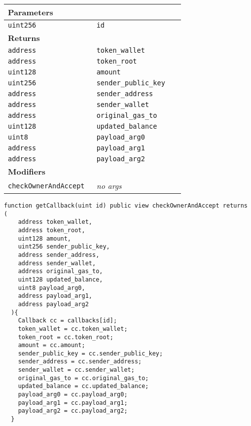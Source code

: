 \ifsoltables
\noindent\begin{tabular}{|l|l|p{5cm}|}\hline
\multicolumn{3}{|l|}{\bf Parameters}\\\hline
\tt uint256 & \tt id &\\\hline
\multicolumn{3}{|l|}{\bf Returns}\\\hline
\tt address & \tt token\_{}wallet &\\\hline
\tt address & \tt token\_{}root &\\\hline
\tt uint128 & \tt amount &\\\hline
\tt uint256 & \tt sender\_{}public\_{}key &\\\hline
\tt address & \tt sender\_{}address &\\\hline
\tt address & \tt sender\_{}wallet &\\\hline
\tt address & \tt original\_{}gas\_{}to &\\\hline
\tt uint128 & \tt updated\_{}balance &\\\hline
\tt uint8 & \tt payload\_{}arg0 &\\\hline
\tt address & \tt payload\_{}arg1 &\\\hline
\tt address & \tt payload\_{}arg2 &\\\hline
\multicolumn{3}{|l|}{\bf Modifiers}\\\hline
\tt checkOwnerAndAccept & {\em no args} &\\\hline
\end{tabular}
\fi

\vspace{2cm}

\begin{lstlisting}[firstnumber=318]
  function getCallback(uint id) public view checkOwnerAndAccept returns (
    address token_wallet,
    address token_root,
    uint128 amount,
    uint256 sender_public_key,
    address sender_address,
    address sender_wallet,
    address original_gas_to,
    uint128 updated_balance,
    uint8 payload_arg0,
    address payload_arg1,
    address payload_arg2
  ){
    Callback cc = callbacks[id];
    token_wallet = cc.token_wallet;
    token_root = cc.token_root;
    amount = cc.amount;
    sender_public_key = cc.sender_public_key;
    sender_address = cc.sender_address;
    sender_wallet = cc.sender_wallet;
    original_gas_to = cc.original_gas_to;
    updated_balance = cc.updated_balance;
    payload_arg0 = cc.payload_arg0;
    payload_arg1 = cc.payload_arg1;
    payload_arg2 = cc.payload_arg2;
  }
\end{lstlisting}


